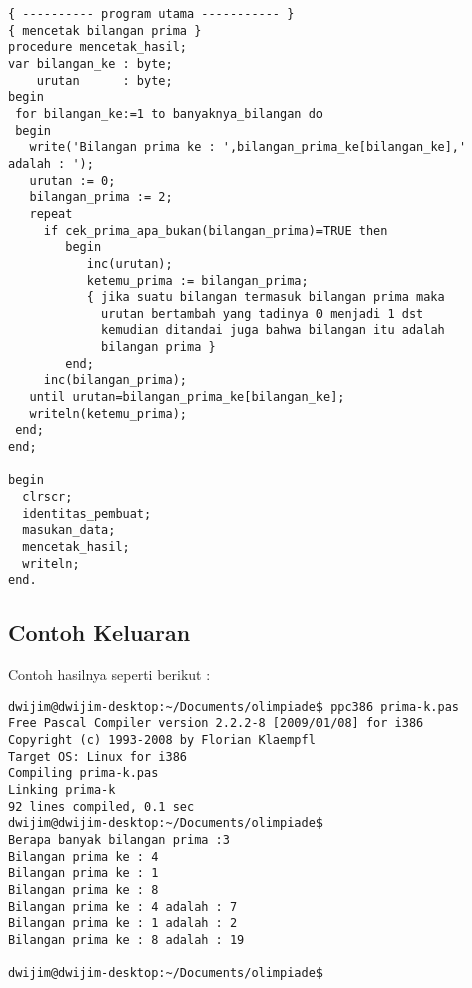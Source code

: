 \documentclass[a4paper,10pt,makeidx]{article}
\begin{document}
\begin{verbatim}
{ ---------- program utama ----------- }
{ mencetak bilangan prima }
procedure mencetak_hasil;
var bilangan_ke : byte;
    urutan      : byte;
begin
 for bilangan_ke:=1 to banyaknya_bilangan do
 begin
   write('Bilangan prima ke : ',bilangan_prima_ke[bilangan_ke],' adalah : ');
   urutan := 0;
   bilangan_prima := 2;
   repeat
     if cek_prima_apa_bukan(bilangan_prima)=TRUE then
        begin
           inc(urutan); 
           ketemu_prima := bilangan_prima;
           { jika suatu bilangan termasuk bilangan prima maka
             urutan bertambah yang tadinya 0 menjadi 1 dst
             kemudian ditandai juga bahwa bilangan itu adalah 
             bilangan prima }
        end;
     inc(bilangan_prima);
   until urutan=bilangan_prima_ke[bilangan_ke];
   writeln(ketemu_prima);
 end;
end;

begin
  clrscr;
  identitas_pembuat;
  masukan_data;
  mencetak_hasil;
  writeln;
end.
\end{verbatim}
\subsection{Contoh Keluaran}
\par
\indent
\indent
Contoh hasilnya seperti berikut :
\begin{verbatim}
dwijim@dwijim-desktop:~/Documents/olimpiade$ ppc386 prima-k.pas 
Free Pascal Compiler version 2.2.2-8 [2009/01/08] for i386
Copyright (c) 1993-2008 by Florian Klaempfl
Target OS: Linux for i386
Compiling prima-k.pas
Linking prima-k
92 lines compiled, 0.1 sec 
dwijim@dwijim-desktop:~/Documents/olimpiade$ 
Berapa banyak bilangan prima :3
Bilangan prima ke : 4
Bilangan prima ke : 1
Bilangan prima ke : 8
Bilangan prima ke : 4 adalah : 7
Bilangan prima ke : 1 adalah : 2
Bilangan prima ke : 8 adalah : 19

dwijim@dwijim-desktop:~/Documents/olimpiade$ 
\end{verbatim}
\end{document}
